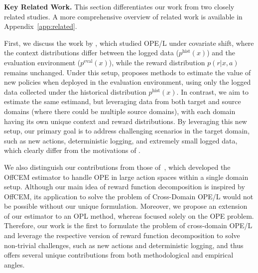 \documentclass{article} %
\theoremstyle{definition}
\begin{document}
\textbf{Key Related Work.}
This section differentiates our work from two closely related studies. A more comprehensive overview of related work is available in Appendix~\ref{app:related}.

First, we discuss the work by \cite{uehara2020off}, which studied OPE/L under covariate shift, where the context distributions differ between the logged data ($p^{\text{hist}}(x)$) and the evaluation environment ($p^{\text{eval}}(x)$), while the reward distribution $p(r|x,a)$ remains unchanged. Under this setup, \cite{uehara2020off} proposes methods to estimate the value of new policies when deployed in the evaluation environment, using only the logged data collected under the historical distribution $p^{\text{hist}}(x)$. In contrast, we aim to estimate the same estimand, but leveraging data from both target and source domains (where there could be multiple source domains), with each domain having its own unique context and reward distributions. By leveraging this new setup, our primary goal is to address challenging scenarios in the target domain, such as new actions, deterministic logging, and extremely small logged data, which clearly differ from the motivations of \cite{uehara2020off}.

We also distinguish our contributions from those of~\cite{saito2023off}, which developed the OffCEM estimator to handle OPE in large action spaces within a single domain setup. Although our main idea of reward function decomposition is inspired by OffCEM, its application to solve the problem of Cross-Domain OPE/L would not be possible without our unique formulation. Moreover, we propose an extension of our estimator to an OPL method, whereas \cite{saito2023off} focused solely on the OPE problem. Therefore, our work is the first to formulate the problem of cross-domain OPE/L and leverage the respective version of reward function decomposition to solve non-trivial challenges, such as new actions and deterministic logging, and thus offers several unique contributions from both methodological and empirical angles.
\end{document}

